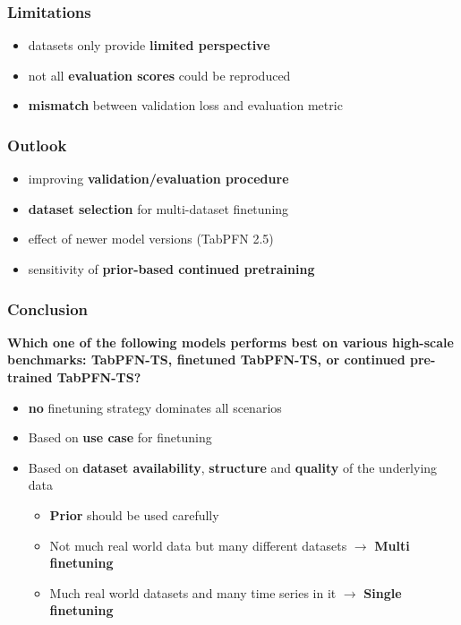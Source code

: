 \documentclass[t,aspectratio=169,svgnames]{beamer}
\begin{document}
\begin{frame}
\frametitle{Limitations}
    \begin{itemize}
        \setlength{\itemsep}{10pt}
        \item<2-> datasets only provide \textbf{limited perspective}
        \item<3-> not all \textbf{evaluation scores} could be reproduced
        \item<4-> \textbf{mismatch} between validation loss and evaluation metric
    \end{itemize}
\end{frame}

\begin{frame}
\frametitle{Outlook}
    \begin{itemize}
        \setlength{\itemsep}{10pt}
        \item<2-> improving \textbf{validation/evaluation procedure}
        \item<3-> \textbf{dataset selection} for multi-dataset finetuning
        \item<5-> effect of newer model versions (TabPFN 2.5)
        \item<6-> sensitivity of \textbf{prior-based continued pretraining}
    \end{itemize}
\end{frame}


\begin{frame}
\frametitle{Conclusion}
    \textbf{Which one of the following models performs best on various high-scale benchmarks: TabPFN-TS, finetuned TabPFN-TS, or continued pre-trained TabPFN-TS?}
    \begin{itemize}
        \setlength{\itemsep}{10pt}
        \item<2-> \textbf{no} finetuning strategy dominates all scenarios
        \item<3-> Based on \textbf{use case} for finetuning
        \item<4-> Based on \textbf{dataset availability}, \textbf{structure} and \textbf{quality} of the underlying data
        \begin{itemize}
            \item<5-> \textbf{Prior} should be used carefully
            \item<5-> Not much real world data but many different datasets $\rightarrow$ \textbf{Multi finetuning}
            \item<5-> Much real world datasets and many time series in it $\rightarrow$ \textbf{Single finetuning}
        \end{itemize}
    \end{itemize}
\end{frame}
\end{document}
